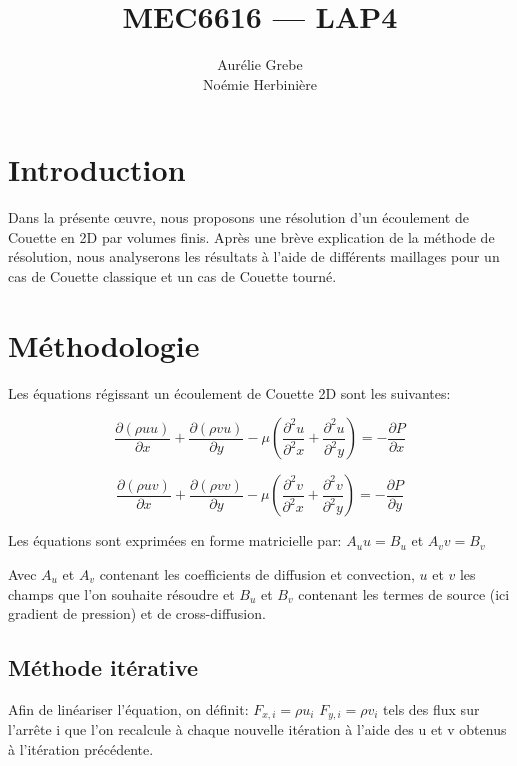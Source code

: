 \documentclass[12pt]{article}
\title{MEC6616 --- LAP4}
\author{Aurélie Grebe\\Noémie Herbinière}
\date{\displaydate{duedate}}
\begin{document}
\maketitle

\section{Introduction}

Dans la présente œuvre, nous proposons une résolution d'un écoulement de Couette en 2D par volumes finis. Après une brève explication de la méthode de résolution, nous analyserons les résultats à l'aide de différents maillages pour un cas de Couette classique et un cas de Couette tourné.

\section{Méthodologie}

Les équations régissant un écoulement de Couette 2D sont les suivantes:

\begin{equation} 
\frac{\partial {(\rho u u)}}{\partial x} + \frac{\partial {(\rho v u)}}{\partial y} - \mu \left(\frac{\partial^2 u}{\partial^2 x} + \frac{\partial^2 u}{\partial^2 y} \right) = - \frac{\partial P}{\partial x}
\label{eq:pde_u}
\end{equation}

\begin{equation} 
\frac{\partial {(\rho u v)}}{\partial x} + \frac{\partial {(\rho v v)}}{\partial y} - \mu \left(\frac{\partial^2 v}{\partial^2 x} + \frac{\partial^2 v}{\partial^2 y} \right) = - \frac{\partial P}{\partial y}
\label{eq:pde_v}
\end{equation}

Les équations sont exprimées en forme matricielle par: $A_u u = B_u$ et $A_v v = B_v$

Avec $A_u$ et $A_v$ contenant les coefficients de diffusion et convection, $u$ et $v$ les champs que l'on souhaite résoudre et $B_u$ et $B_v$ contenant les termes de source (ici gradient de pression) et de cross-diffusion.

\subsection{Méthode itérative}

Afin de linéariser l'équation, on définit:
$F_{x,i} = \rho u_i$ $F_{y,i} = \rho v_i$ tels des flux sur l'arrête i que l'on recalcule à chaque nouvelle itération à l'aide des u et v obtenus à l'itération précédente.
\end{document}
